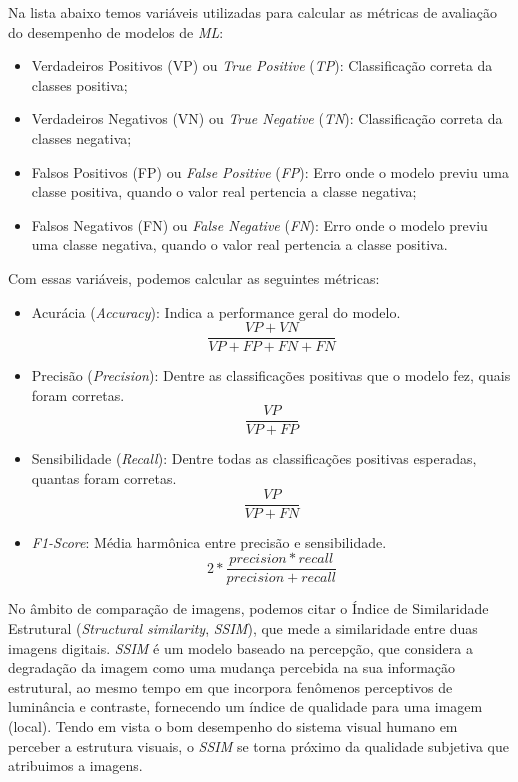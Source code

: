 Na lista abaixo temos variáveis utilizadas para calcular as métricas de avaliação do desempenho de modelos de \textit{ML}:

\begin{itemize}
    \item Verdadeiros Positivos (VP) ou \textit{True Positive} (\textit{TP}): Classificação correta da classes positiva;
    \item Verdadeiros Negativos (VN) ou \textit{True Negative} (\textit{TN}): Classificação correta da classes negativa;
    \item Falsos Positivos (FP) ou \textit{False Positive} (\textit{FP}): Erro onde o modelo previu uma classe positiva, quando o valor real pertencia a classe negativa;
    \item Falsos Negativos (FN) ou \textit{False Negative} (\textit{FN}): Erro onde o modelo previu uma classe negativa, quando
o valor real pertencia a classe positiva.
\end{itemize}

Com essas variáveis, podemos calcular as seguintes métricas:

\begin{itemize}
    \item Acurácia (\textit{Accuracy}): Indica a performance geral do modelo.
        \begin{equation}
        \frac{VP + VN}{VP+FP+FN+FN}
        \end{equation}
    \item Precisão (\textit{Precision}): Dentre as classificações positivas que o modelo fez, quais foram corretas.
        \begin{equation}
        \frac{VP}{VP+FP}
        \end{equation}
    \item Sensibilidade (\textit{Recall}): Dentre todas as classificações positivas esperadas, quantas foram corretas.
        \begin{equation}
        \frac{VP}{VP+FN}
        \end{equation}
    \item \textit{F1-Score}: Média harmônica entre precisão e sensibilidade.
        \begin{equation}
        2 * \frac{precision  * recall}{precision + recall}
        \end{equation}
\end{itemize}

No âmbito de comparação de imagens, podemos citar o Índice de Similaridade Estrutural (\textit{Structural similarity}, \textit{SSIM}), que mede a similaridade entre duas imagens digitais. \textit{SSIM} é um modelo baseado na percepção, que considera a degradação da imagem como uma mudança percebida na sua informação estrutural, ao mesmo tempo em que incorpora fenômenos perceptivos de luminância e contraste, fornecendo um índice de qualidade para uma imagem (local). Tendo em vista o bom desempenho do sistema visual humano \cite{61} em perceber a estrutura visuais, o \textit{SSIM} se torna próximo da qualidade subjetiva que atribuimos a imagens.

